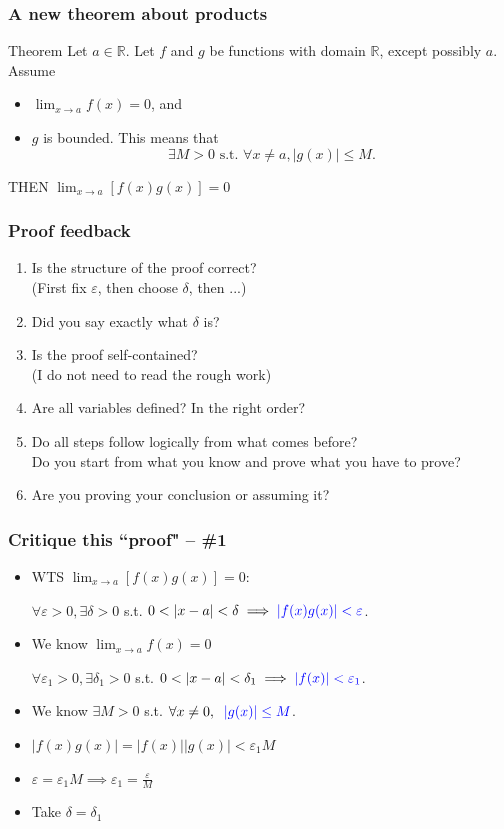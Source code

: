 \documentclass[14pt]{beamer}
\newcommand {\DS} [1] {${\displaystyle #1}$}
\newcommand {\R}{\mathbb{R}}
\newcommand{\e}{\varepsilon}
\newcommand{\azul}[1]{{\color{blue} #1}}
\newcommand{\setsize}[1]{\fontsize{#1}{#1}\selectfont} %
\newcommand{\smallerfont}{\setsize{13}} %
\begin{document}
\begin{frame}[t]
\frametitle{A new theorem about products}
\smallerfont
\begin{block}{Theorem}
Let $a \in \R$.  Let $f$ and $g$ be functions with domain $\R$, except possibly $a$. 
 Assume
	\begin{itemize}
		\item  \DS{\lim_{x \to a} f(x) = 0}, and
		\item $g$ is bounded. 
			This means that 
			$$\exists M >0 \mbox{ s.t. } \forall x \neq a, |g(x)| \leq M.$$
	\end{itemize}
THEN  \DS{\lim_{x \to a} \left[ f(x) g(x) \right] = 0}
\end{block}
\end{frame}

\begin{frame}[t]
\frametitle{Proof feedback}

\begin{enumerate}
	\item  Is the structure of the proof correct?  \\
	(First fix $\e$, then choose $\delta$, then ...)
	\item  Did you say exactly what $\delta$ is?
	\item  Is the proof self-contained?  \\
	 (I do not need to read the rough work)
	\item  Are all variables defined?  In the right order? 
	\item  Do all steps follow logically from what comes before? \\
	Do you start from what you know and prove what you have to prove? \\
	\item  Are you proving your conclusion or assuming it?
\end{enumerate}

\end{frame}
\begin{frame}[t]
\frametitle{Critique this ``proof" -- \#1}
\smallerfont
\begin{itemize}
	\item  WTS \DS{\lim_{x \to a} \left[ f(x) g(x) \right] = 0}:
	
		\hfill \DS{\forall \e>0, \exists \delta>0} \; s.t. \; \DS{0<|x-a|<\delta \implies \azul{|f(x) g(x)| < \e}}. 
\vfill	
	\item  We know \DS{\lim_{x \to a} f(x) = 0}
	
		\hfill \DS{\forall \e_1>0, \exists \delta_1 >0 } \; s.t. \; \DS{0<|x-a|<\delta_1 \implies \azul{|f(x)| <\e_1}}.
\vfill
	\item   We know \hfill \DS{\exists M>0} \; s.t. \; \DS{\forall x \neq 0, \; \; \azul{|g(x)| \leq M}}.
\vfill
	\item  \DS{|f(x)g(x)| = |f(x)||g(x)| < \e_1 M}
\vfill
	\item \DS{\e = \e_1 M \implies \e_1 = \frac{\e}{M}}
\vfill
	\item Take  \DS{\delta = \delta_1}
\vfill
\end{itemize}
\end{frame}
\end{document}
